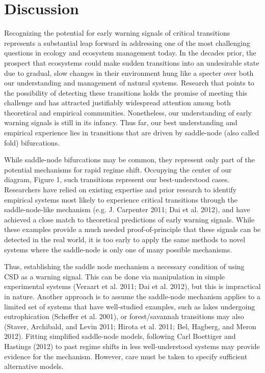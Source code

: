 \documentclass[author-year, review]{elsarticle} %
\begin{document}
\section{Discussion}

Recognizing the potential for early warning signals of critical
transitions represents a substantial leap forward in addressing one of
the most challenging questions in ecology and ecosystem management
today. In the decades prior, the prospect that ecosystems could make
sudden transitions into an undesirable state due to gradual, slow
changes in their environment hung like a specter over both our
understanding and management of natural systems. Research that points to
the possibility of detecting these transitions holds the promise of
meeting this challenge and has attracted justifiably widespread
attention among both theoretical and empirical communities. Nonetheless,
our understanding of early warning signals is still in its infancy. Thus
far, our best understanding and empirical experience lies in transitions
that are driven by saddle-node (also called fold) bifurcations.

While saddle-node bifurcations may be common, they represent only part
of the potential mechanisms for rapid regime shift. Occupying the center
of our diagram, Figure 1, such transitions represent our best-understood
cases. Researchers have relied on existing expertise and prior research
to identify empirical systems most likely to experience critical
transitions through the saddle-node-like mechanism (e.g. J. Carpenter
2011; Dai et al. 2012), and have achieved a close match to theoretical
predictions of early warning signals. While these examples provide a
much needed proof-of-principle that these signals can be detected in the
real world, it is too early to apply the same methods to novel systems
where the saddle-node is only one of many possible mechanisms.

Thus, establishing the saddle node mechanism a necessary condition of
using CSD as a warning signal. This can be done via manipulation in
simple experimental systems (Veraart et al. 2011; Dai et al. 2012), but
this is impractical in nature. Another approach is to assume the
saddle-node mechanism applies to a limited set of systems that have
well-studied examples, such as lakes undergoing eutrophication (Scheffer
et al. 2001), or forest/savannah transitions may also (Staver,
Archibald, and Levin 2011; Hirota et al. 2011; Bel, Hagberg, and Meron
2012). Fitting simplified saddle-node models, following Carl Boettiger
and Hastings (2012) to past regime shifts in less well-understood
systems may provide evidence for the mechanism. However, care must be
taken to specify sufficient alternative models.
\end{document}
